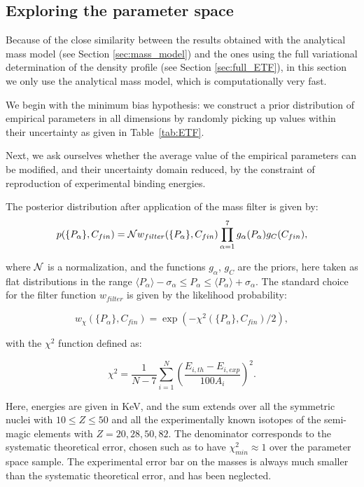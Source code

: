 \documentclass
[aps,prc,twocolumn,showpacs,showkeys,amsmath,floatfix,superscriptaddress]{revtex4}
\begin{document}
{{\subsection{Exploring the parameter space} \label{sec:filter}

Because of the close similarity between the results obtained with the analytical mass model (see Section \ref{sec:mass_model}) and the ones using the full variational 
determination of the density profile (see Section \ref{sec:full_ETF}), in this section we only use the analytical mass model, which is computationally very fast.

We begin with the minimum bias hypothesis: we construct a prior distribution of empirical parameters in all dimensions 
by randomly picking up values within their uncertainty
as given in Table~\ref{tab:ETF}. 

Next, we ask ourselves whether the average value of the empirical parameters can be modified, and their  uncertainty domain  reduced, by the constraint of reproduction of experimental binding energies.  

The posterior distribution after application of the mass filter is given by:
\begin{equation}
p(\{P_\alpha\},C_{fin})={\cal N} w_{filter}(\{P_\alpha\},C_{fin})\prod_{\alpha=1}^7 g_\alpha(P_\alpha) g_C(C_{fin}),
\end{equation}

where ${\cal N}$ is a normalization, and the functions $g_\alpha$, $g_C$ are the priors, here taken as flat distributions  in the range $\langle{P}_\alpha\rangle -\sigma_\alpha \le P_\alpha \le \langle{P}_\alpha\rangle +\sigma_\alpha$.
The standard choice for the filter function $w_{filter}$ is given by the likelihood probability:

\begin{equation}
w_{\chi}(\{P_\alpha\},C_{fin})= \exp (-\chi^2(\{P_\alpha\}, C_{fin})/2),
\label{eq:likehood}
\end{equation}

with the $\chi^2$ function defined as:

\begin{equation}
\chi^2 = \frac{1}{N-7} \sum_{i=1}^N \left(\frac{E_{i,th}-E_{i,exp}}{100 A_i}\right)^2.
\label{eq:chi2}
\end{equation}

Here, energies are given in KeV,  and the sum extends over all the symmetric nuclei
with $10\le Z \le 50$ and all the experimentally known isotopes of the semi-magic elements with $Z=20,28,50,82$. The denominator corresponds to the systematic theoretical error, chosen such as to have 
$\chi^2_{min}\approx 1$ over the parameter space sample\cite{dobaczewski}. 
The experimental error bar on the masses is always much smaller than the systematic theoretical error, and has been neglected. 

}}
\end{document}
